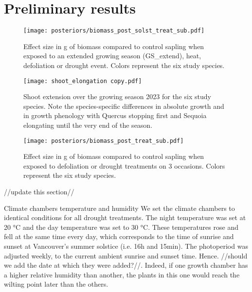 \documentclass{article}
\begin{document}
	
	\section*{Preliminary results}
	
	
	
	\begin{figure}
	\centering
	\texttt{[image: posteriors/biomass\_post\_solst\_treat\_sub.pdf]} 
	\caption{Effect size in g of biomass compared to control sapling when exposed to an extended growing season (GS\_extend), heat, defoliation or drought event. Colors represent the six study species. }
	\label{fig:fig_1xxx}
\end{figure}
	
	
			\begin{figure}
		\centering
		\texttt{[image: shoot\_elongation copy.pdf]} 
		\caption{Shoot extension over the growing season 2023 for the six study species. Note the species-specific differences in absolute growth and in growth phenology with Quercus stopping first and Sequoia elongating until the very end of the season.}
		\label{fig:fig_1xxx}
	\end{figure}
	
	
				\begin{figure}
		\centering
		\texttt{[image: posteriors/biomass\_post\_treat\_sub.pdf]} 
		\caption{Effect size in g of biomass compared to control sapling when exposed to defoliation or drought treatments on 3 occasions. Colors represent the six study species.}
		\label{fig:fig_1xxx}
	\end{figure}
	
	
	
	

	

	
	//update this section//
	
	Climate chambers temperature and humidity
	We set the climate chambers to identical conditions for all drought treatments. The night temperature was set at 20 °C and the day temperature was set to 30 °C. These temperatures rose and fell at the same time every day, which corresponds to the time of sunrise and sunset at Vancouver’s summer solstice (i.e. 16h and 15min). The photoperiod was adjusted weekly, to the current ambient sunrise and sunset time. Hence.  //should we add the date at which they were added?//. Indeed, if one growth chamber has a higher relative humidity than another, the plants in this one would reach the wilting point later than the others. 
	
\end{document}
